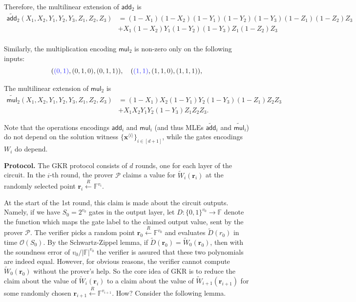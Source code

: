 \documentclass{gkr-template}
\begin{document}
Therefore, the multilinear extension of $\mathsf{add}_2$ is
\begin{align*}
    \widetilde{\mathsf{add}}_2(X_1,X_2,Y_1,Y_2,Y_3,Z_1,Z_2,Z_3) &= (1-X_1)(1-X_2)(1-Y_1)(1-Y_2)(1-Y_3)(1-Z_1)(1-Z_2)Z_3 \\
    &+ X_1(1-X_2)Y_1(1-Y_2)(1-Y_3)Z_1(1-Z_2)Z_3 \\
\end{align*}

Similarly, the multiplication encoding $\mathsf{mul}_2$ is non-zero only on the
following inputs:
\begin{equation*}
    (\textcolor{blue!80}{(0,1)},\textcolor{gray!20!black}{(0,1,0)},\textcolor{gray!20!black}{(0,1,1)}), 
    \quad
    (\textcolor{blue!80}{(1,1)},\textcolor{gray!20!black}{(1,1,0)},\textcolor{gray!20!black}{(1,1,1)}),
\end{equation*}

The multilinear extension of $\mathsf{mul}_2$ is
\begin{align*}
    \widetilde{\mathsf{mul}}_2(X_1,X_2,Y_1,Y_2,Y_3,Z_1,Z_2,Z_3) &= (1-X_1)X_2(1-Y_1)Y_2(1-Y_3)(1-Z_1)Z_2Z_3 \\
    &+ X_1X_2Y_1Y_2(1-Y_3)Z_1Z_2Z_3.
\end{align*}

\begin{remark}
    Note that the operations encodings $\mathsf{add}_i$ and $\mathsf{mul}_i$
    (and thus MLEs $\widetilde{\mathsf{add}}_i$ and
    $\widetilde{\mathsf{mul}}_i$) do not depend on the solution witness
    $\{\mathbf{x}^{\langle i \rangle}\}_{i \in [d+1]}$, while the gates
    encodings $W_i$ do depend.
\end{remark}

\textbf{Protocol.} The GKR protocol consists of $d$ rounds, one for each layer
of the circuit. In the $i$-th round, the prover $\mathcal{P}$ claims a value for
$\widetilde{W}_i(\mathbf{r}_i)$ at the randomly selected point $\mathbf{r}_i
\xleftarrow{R} \mathbb{F}^{v_i}$. 

At the start of the 1st round, this claim is made about the circuit outputs.
Namely, if we have $S_0=2^{v_0}$ gates in the output layer, let $D:
\{0,1\}^{v_0} \to \mathbb{F}$ denote the function which maps the gate label to
the claimed output value, sent by the prover $\mathcal{P}$. The verifier picks a
random point $\mathbf{r}_0 \xleftarrow{R} \mathbb{F}^{v_0}$ and evaluates
$\widetilde{D}(r_0)$ in time $\mathcal{O}(S_0)$. By the Schwartz-Zippel lemma,
if $\widetilde{D}(\mathbf{r}_0)=\widetilde{W}_0(\mathbf{r}_0)$, then with the
soundness error of $v_0/|\mathbb{F}|^{v_0}$ the verifier is assured that these
two polynomials are indeed equal. However, for obvious reasons, the verifier
cannot compute $\widetilde{W}_0(\mathbf{r}_0)$ without the prover's help. So the
core idea of GKR is to reduce the claim about the value of
$\widetilde{W}_i(\mathbf{r}_i)$ to a claim about the value of
$\widetilde{W}_{i+1}(\mathbf{r}_{i+1})$ for some randomly chosen
$\mathbf{r}_{i+1} \xleftarrow{R} \mathbb{F}^{v_{i+1}}$. How? Consider the
following lemma.
\end{document}

